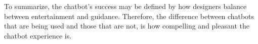 \documentclass[a4paper,10pt]{article}
\begin{document}
To summarize, the chatbot’s success may be defined by how designers balance between entertainment and guidance. Therefore, the difference between chatbots that are being used and those that are not, is how compelling and pleasant the chatbot experience is.





\end{document}
